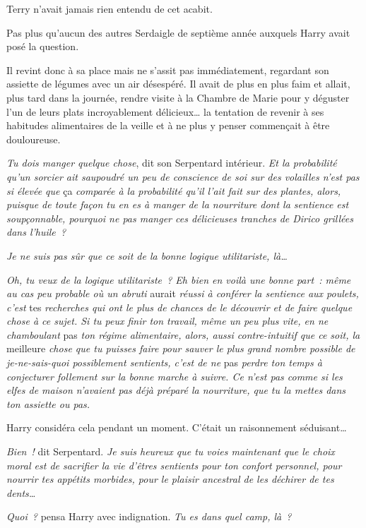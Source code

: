 \later

Terry n'avait jamais rien entendu de cet acabit.

Pas plus qu'aucun des autres Serdaigle de septième année auxquels Harry avait posé la question.

Il revint donc à sa place mais ne s'assit pas immédiatement, regardant son assiette de légumes avec un air désespéré.
Il avait de plus en plus faim et allait, plus tard dans la journée, rendre visite à la Chambre de Marie pour y déguster l'un de leurs plats incroyablement délicieux… la tentation de revenir à ses habitudes alimentaires de la veille et à ne plus y penser commençait à être douloureuse.

\emph{Tu dois manger quelque chose}, dit son Serpentard intérieur.
\emph{Et la probabilité qu'un sorcier ait saupoudré un peu de conscience de soi sur des volailles n'est pas si élevée que} ça \emph{comparée à la probabilité qu'il l'ait fait sur des plantes, alors, puisque de toute façon tu en es à manger de la nourriture dont la sentience est soupçonnable, pourquoi ne pas manger ces délicieuses tranches de Dirico grillées dans l'huile~?}

\emph{Je ne suis pas sûr que ce soit de la bonne logique utilitariste, là…}

\emph{Oh, tu veux de la logique utilitariste~?
Eh bien en voilà une bonne part~: même au cas peu probable où un abruti} aurait \emph{réussi à conférer la sentience aux poulets, c'est} tes \emph{recherches qui ont le plus de chances de le découvrir et de faire quelque chose à ce sujet.
Si tu peux finir ton travail, même un peu plus vite, en ne chamboulant} pas \emph{ton régime alimentaire, alors, aussi contre-intuitif que ce soit, la} meilleure \emph{chose que tu puisses faire pour sauver le plus grand nombre possible de je-ne-sais-quoi possiblement sentients, c'est de ne} pas \emph{perdre ton temps à conjecturer follement sur la bonne marche à suivre.
Ce n'est pas comme si les elfes de maison n'avaient pas déjà préparé la nourriture, que tu la mettes dans ton assiette ou pas.}

Harry considéra cela pendant un moment.
C'était un raisonnement séduisant…

\emph{Bien~!} dit Serpentard.
\emph{Je suis heureux que tu voies maintenant que le choix moral est de sacrifier la vie d'êtres sentients pour ton confort personnel, pour nourrir tes appétits morbides, pour le plaisir ancestral de les déchirer de tes dents…}

\emph{Quoi~?} pensa Harry avec indignation.
\emph{Tu es dans quel camp, là~?}

